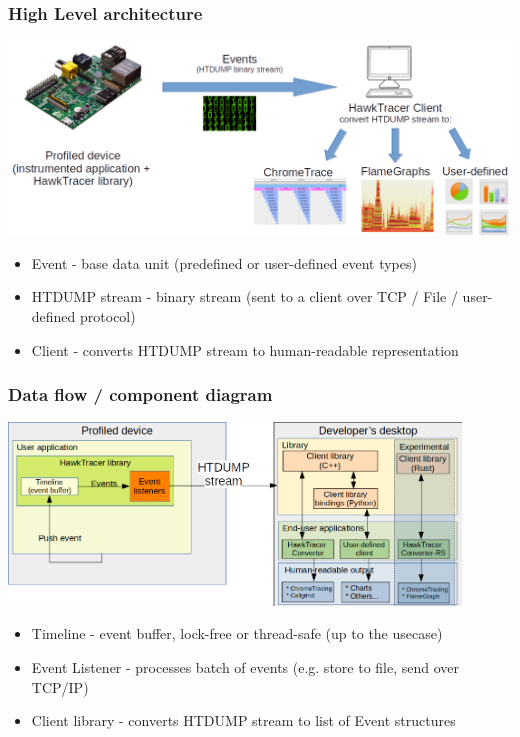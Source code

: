 \documentclass{beamer}
\begin{document}
\begin{frame}[fragile]
  \frametitle{High Level architecture}
  \includegraphics[width=1\textwidth]{img/high-level-architecture.png} \\
  \begin{itemize}
    \item Event - base data unit (predefined or user-defined event types)
    \item HTDUMP stream - binary stream (sent to a client over TCP / File / user-defined protocol)
    \item Client - converts HTDUMP stream to human-readable representation
  \end{itemize}
\end{frame}

\begin{frame}[fragile]
  \frametitle{Data flow / component diagram}
  \begin{center}
    \includegraphics[width=0.9\textwidth]{img/data-flow.png}
    \begin{itemize}
      \item Timeline - event buffer, lock-free or thread-safe (up to the usecase)
      \item Event Listener - processes batch of events (e.g. store to file, send over TCP/IP)
      \item Client library - converts HTDUMP stream to list of Event structures
    \end{itemize}
  \end{center}
\end{frame}
\end{document}
